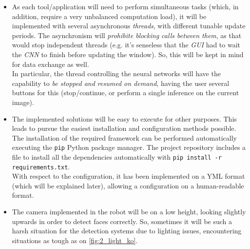 \begin{itemize}
	\item As each tool/application will need to perform simultaneous tasks (which, in addition, require a very unbalanced computation load), it will be implemented with several asynchronous \emph{threads}, with different tunable update periods. The asynchronism will \emph{prohibite blocking calls between them}, as that would stop independent threads (e.g. it's senseless that the \emph{GUI} had to wait the \emph{CNN} to finish before updating the window). So, this will be kept in mind for data exchange as well.\\
	
	In particular, the thread controlling the neural networks will have the capability to \emph{be stopped and resumed on demand}, having the user several buttons for this (stop/continue, or perform a single inference on the current image).\\
	
	\item The implemented solutions will be easy to execute for other purposes. This leads to pursue the easiest installation and configuration methods possible.\\
	
	The installation of the required framework can be performed automatically executing the \texttt{pip} Python package manager. The project repository includes a file to install all the dependencies automatically with \texttt{pip install -r requirements.txt}.\\
	
	With respect to the configuration, it has been implemented on a YML format (which will be explained later), allowing a configuration on a human-readable format.
	
	\item The camera implemented in the robot will be on a low height, looking slightly upwards in order to detect faces correctly. So, sometimes it will be such a harsh situation for the detection systems due to lighting issues, encountering situations as tough as on \autoref{fig:2_light_ko}.
	

\end{itemize}
